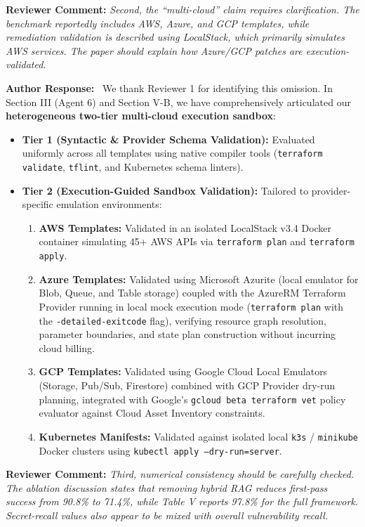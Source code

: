 \documentclass[11pt,a4paper]{article}
\newcommand{\reviewercomment}[1]{%
    \vspace{0.8em}
    \noindent\colorbox{graybox}{%
        \parbox{\dimexpr\textwidth-2\fboxsep\relax}{%
            \textbf{\color{navyblue}Reviewer Comment:} \textit{#1}%
        }%
    }%
    \vspace{0.4em}
}
\newcommand{\ourresponse}{%
    \noindent\textbf{\color{navyblue}Author Response:}\ %
}
\begin{document}
\reviewercomment{Second, the ``multi-cloud'' claim requires clarification. The benchmark reportedly includes AWS, Azure, and GCP templates, while remediation validation is described using LocalStack, which primarily simulates AWS services. The paper should explain how Azure/GCP patches are execution-validated.}

\ourresponse We thank Reviewer 1 for identifying this omission. In Section III (Agent 6) and Section V-B, we have comprehensively articulated our \textbf{heterogeneous two-tier multi-cloud execution sandbox}:
\begin{itemize}
    \item \textbf{Tier 1 (Syntactic \& Provider Schema Validation):} Evaluated uniformly across all templates using native compiler tools (\texttt{terraform validate}, \texttt{tflint}, and Kubernetes schema linters).
    \item \textbf{Tier 2 (Execution-Guided Sandbox Validation):} Tailored to provider-specific emulation environments:
    \begin{enumerate}
        \item \textbf{AWS Templates:} Validated in an isolated LocalStack v3.4 Docker container simulating 45+ AWS APIs via \texttt{terraform plan} and \texttt{terraform apply}.
        \item \textbf{Azure Templates:} Validated using Microsoft Azurite (local emulator for Blob, Queue, and Table storage) coupled with the AzureRM Terraform Provider running in local mock execution mode (\texttt{terraform plan} with the \texttt{-detailed-exitcode} flag), verifying resource graph resolution, parameter boundaries, and state plan construction without incurring cloud billing.
        \item \textbf{GCP Templates:} Validated using Google Cloud Local Emulators (Storage, Pub/Sub, Firestore) combined with GCP Provider dry-run planning, integrated with Google's \texttt{gcloud beta terraform vet} policy evaluator against Cloud Asset Inventory constraints.
        \item \textbf{Kubernetes Manifests:} Validated against isolated local \texttt{k3s} / \texttt{minikube} Docker clusters using \texttt{kubectl apply --dry-run=server}.
    \end{enumerate}
\end{itemize}

\reviewercomment{Third, numerical consistency should be carefully checked. The ablation discussion states that removing hybrid RAG reduces first-pass success from 90.8\% to 71.4\%, while Table V reports 97.8\% for the full framework. Secret-recall values also appear to be mixed with overall vulnerability recall.}
\end{document}
